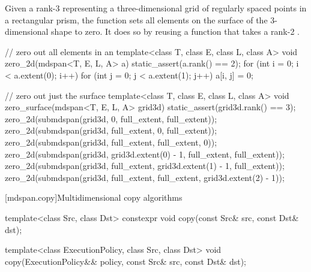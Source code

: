 \pnum
\begin{example}
Given a rank-3  representing a three-dimensional grid
of regularly spaced points in a rectangular prism,
the function  sets all elements on
the surface of the 3-dimensional shape to zero.
It does so by reusing a function 
that takes a rank-2 .

\begin{codeblock}
// zero out all elements in an 
template<class T, class E, class L, class A>
void zero_2d(mdspan<T, E, L, A> a) {
  static_assert(a.rank() == 2);
  for (int i = 0; i < a.extent(0); i++)
    for (int j = 0; j < a.extent(1); j++)
      a[i, j] = 0;
}

// zero out just the surface
template<class T, class E, class L, class A>
void zero_surface(mdspan<T, E, L, A> grid3d) {
  static_assert(grid3d.rank() == 3);
  zero_2d(submdspan(grid3d, 0, full_extent, full_extent));
  zero_2d(submdspan(grid3d, full_extent, 0, full_extent));
  zero_2d(submdspan(grid3d, full_extent, full_extent, 0));
  zero_2d(submdspan(grid3d, grid3d.extent(0) - 1, full_extent, full_extent));
  zero_2d(submdspan(grid3d, full_extent, grid3d.extent(1) - 1, full_extent));
  zero_2d(submdspan(grid3d, full_extent, full_extent, grid3d.extent(2) - 1));
}
\end{codeblock}
\end{example}

[mdspan.copy]{Multidimensional copy algorithms}

%
\begin{itemdecl}
template<class Src, class Dst>
  constexpr void copy(const Src& src, const Dst& dst);

template<class ExecutionPolicy, class Src, class Dst>
  void copy(ExecutionPolicy&& policy, const Src& src, const Dst& dst);
\end{itemdecl}

